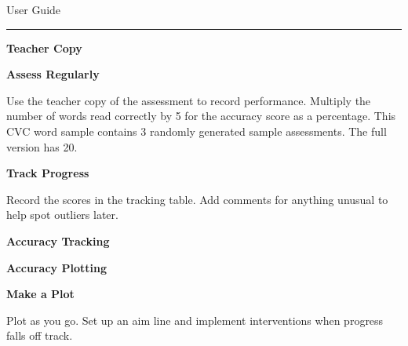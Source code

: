\documentclass[12pt]{memoir}
\begin{document}
\noindent
User Guide
\smallskip
\hrule

\vfill

\begin{minipage}{0.3\textwidth}
\begin{flushleft}
\footnotesize \bf Teacher Copy
\end{flushleft}
\end{minipage}
\hspace{1cm}
\begin{minipage}{0.5\textwidth}
{\large \textbf{Assess Regularly}}

Use the teacher copy of the assessment to record performance. Multiply the
number of words read correctly by 5 for the accuracy score as a percentage.
This CVC word sample contains 3 randomly generated sample assessments. The full
version has 20.  
\end{minipage}

\vfill

\begin{minipage}{0.5\textwidth}
{\large \textbf{Track Progress}}

Record the scores in the tracking table. Add comments for anything unusual
to help spot outliers later. 
\end{minipage}
\hspace{1cm}
\begin{minipage}{0.3\textwidth}
\begin{flushleft}
\footnotesize \bf Accuracy Tracking
\end{flushleft}
\end{minipage}

\vfill

\begin{minipage}{0.4\textwidth}
\begin{flushleft}
\footnotesize \bf Accuracy Plotting
\end{flushleft}
\end{minipage}
\hspace{1cm}
\begin{minipage}{0.4\textwidth}
{\large \textbf{Make a Plot}}

Plot as you go. Set up an aim line and implement interventions when progress
falls off track.
\end{minipage}

\vfill
\end{document}
